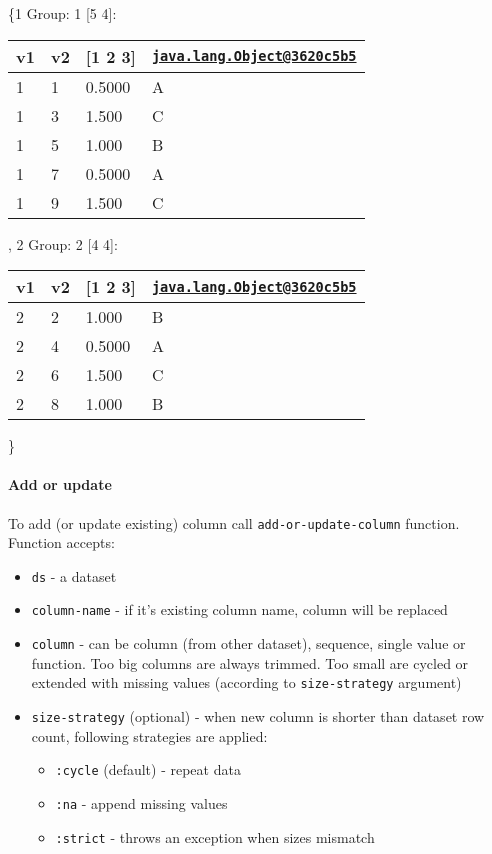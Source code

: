 \documentclass[]{article}
\providecommand{\tightlist}{%
  \setlength{\itemsep}{0pt}\setlength{\parskip}{0pt}}
\let\oldparagraph\paragraph
\renewcommand{\paragraph}[1]{\oldparagraph{#1}\mbox{}}
\begin{document}
\{1 Group: 1 {[}5 4{]}:

\begin{longtable}[]{@{}llll@{}}
\toprule
v1 & v2 & {[}1 2 3{]} &
\href{mailto:java.lang.Object@3620c5b5}{\nolinkurl{java.lang.Object@3620c5b5}}\tabularnewline
\midrule
\endhead
1 & 1 & 0.5000 & A\tabularnewline
1 & 3 & 1.500 & C\tabularnewline
1 & 5 & 1.000 & B\tabularnewline
1 & 7 & 0.5000 & A\tabularnewline
1 & 9 & 1.500 & C\tabularnewline
\bottomrule
\end{longtable}

, 2 Group: 2 {[}4 4{]}:

\begin{longtable}[]{@{}llll@{}}
\toprule
v1 & v2 & {[}1 2 3{]} &
\href{mailto:java.lang.Object@3620c5b5}{\nolinkurl{java.lang.Object@3620c5b5}}\tabularnewline
\midrule
\endhead
2 & 2 & 1.000 & B\tabularnewline
2 & 4 & 0.5000 & A\tabularnewline
2 & 6 & 1.500 & C\tabularnewline
2 & 8 & 1.000 & B\tabularnewline
\bottomrule
\end{longtable}

\}

\paragraph{Add or update}\label{add-or-update}

To add (or update existing) column call \texttt{add-or-update-column}
function. Function accepts:

\begin{itemize}
\tightlist
\item
  \texttt{ds} - a dataset
\item
  \texttt{column-name} - if it's existing column name, column will be
  replaced
\item
  \texttt{column} - can be column (from other dataset), sequence, single
  value or function. Too big columns are always trimmed. Too small are
  cycled or extended with missing values (according to
  \texttt{size-strategy} argument)
\item
  \texttt{size-strategy} (optional) - when new column is shorter than
  dataset row count, following strategies are applied:

  \begin{itemize}
  \tightlist
  \item
    \texttt{:cycle} (default) - repeat data
  \item
    \texttt{:na} - append missing values
  \item
    \texttt{:strict} - throws an exception when sizes mismatch
  \end{itemize}
\end{itemize}
\end{document}
